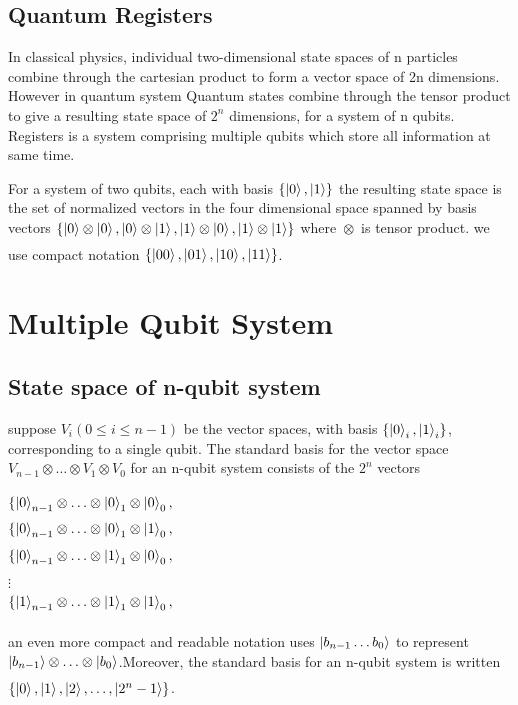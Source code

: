 \documentclass[11 pt]{article}
\theoremstyle{definition}
\theoremstyle{remark}
\newcommand{\tens}[1]{
  \mathbin{\mathop{\otimes}\limits_{#1}}}
\begin{document}
\subsection{Quantum Registers}
In classical physics, individual two-dimensional state spaces of n particles combine through the cartesian product to form a vector space of 2n dimensions. However in quantum system Quantum states combine through the tensor product to give a resulting state space of $2^n$ dimensions, for a system of n qubits. Registers is a system comprising multiple qubits which store all information at same time.

For a system of two qubits, each with basis $\{\ket{0},\ket{1}\}$ the resulting state space is the set of normalized vectors in the four dimensional space spanned by basis vectors
$\{\ket{0} \tens{} \ket{0}, \ket{0} \tens{} \ket{1},\ket{1} \tens{} \ket{0},\ket{1} \tens{} \ket{1}\}$ where $\tens{}$ is tensor product. we use compact notation $\{\ket{00},\ket{01},\ket{10},\ket{11}\}$.


\section{Multiple Qubit System}
\subsection{State space of n-qubit system}
suppose $V_i (0 \leq i \leq n-1) $ be the vector spaces, with basis $\{\ket{0}_i,\ket{1}_i\}$, corresponding to a single qubit. The standard basis for the vector space $V_{n-1} \tens{} \hdots \tens{} V_1 \tens{} V_0$ for an n-qubit system consists of the $2^n$ vectors
\begin{center}
$\{\ket{0}_{n-1} \tens{} \hdots \tens{} \ket{0}_1 \tens{} \ket{0}_0,$\\
$\{\ket{0}_{n-1} \tens{} \hdots \tens{} \ket{0}_1 \tens{} \ket{1}_0,$\\
$\{\ket{0}_{n-1} \tens{} \hdots \tens{} \ket{1}_1 \tens{} \ket{0}_0,$\\
$\vdots$\\
$\{\ket{1}_{n-1} \tens{} \hdots \tens{} \ket{1}_1 \tens{} \ket{1}_0,$\\
\end{center}
an even more compact and readable notation uses $\ket{b_{n-1} \hdots b_0}$ to represent $\ket{b_{n-1}} \tens{} \hdots \tens{} \ket{b_0}$.Moreover, the standard basis for an n-qubit system is written $\{\ket{0},\ket{1},\ket{2},\hdots,\ket{{2^n}-1}\}$.
\end{document}
